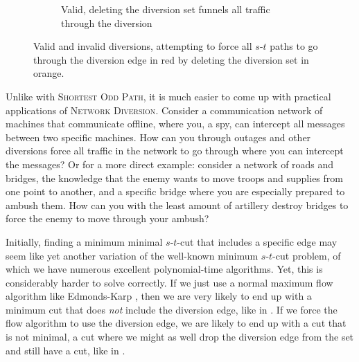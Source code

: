 \begin{figure}[H]
\begin{subfigure}{.3\textwidth}
        \caption{Valid, deleting the diversion set funnels all traffic through the diversion}
        \label{subfigure:valid-diversion}
    \end{subfigure}
    \caption{Valid and invalid diversions, attempting to force all $s$-$t$ paths to go through the diversion edge in red by deleting the diversion set in orange.}
    \label{figure:diversion-attempts}
\end{figure}

Unlike with \textsc{Shortest Odd Path}, it is much easier to come up with practical applications of \textsc{Network Diversion}. Consider a communication network of machines that communicate offline, where you, a spy, can intercept all messages between two specific machines. How can you through outages and other diversions force all traffic in the network to go through where you can intercept the messages? Or for a more direct example: consider a network of roads and bridges, the knowledge that the enemy wants to move troops and supplies from one point to another, and a specific bridge where you are especially prepared to ambush them. How can you with the least amount of artillery destroy bridges to force the enemy to move through your ambush?

Initially, finding a minimum minimal $s$-$t$-cut that includes a specific edge may seem like yet another variation of the well-known minimum $s$-$t$-cut problem, of which we have numerous excellent polynomial-time algorithms. Yet, this is considerably harder to solve correctly. If we just use a normal maximum flow algorithm like Edmonds-Karp \cite{source:edmonds-karp-algorithn}, then we are very likely to end up with a minimum cut that does \emph{not} include the diversion edge, like in . If we force the flow algorithm to use the diversion edge, we are likely to end up with a cut that is not minimal, a cut where we might as well drop the diversion edge from the set and still have a cut, like in .

